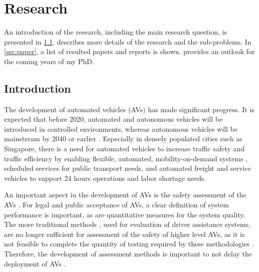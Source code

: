 \section{Research}
\label{sec:research}

An introduction of the research, including the main research question, is presented in \cref{sec:introduction}.  describes more details of the research and the sub-problems. In \cref{sec:paper}, a list of resulted papers and reports is shown.  provides an outlook for the coming years of my PhD.


\subsection{Introduction}
\label{sec:introduction}

The development of automated vehicles (AVs) has made significant progress. It is expected that before 2020, automated and autonomous vehicles will be introduced in controlled environments, whereas autonomous vehicles will be mainstream by 2040 \cite{madni2018autonomous} or earlier \cite{bimbraw2015autonomous}. Especially in densely populated cities such as Singapore, there is a need for automated vehicles to increase traffic safety and traffic efficiency by enabling flexible, automated, mobility-on-demand systems \cite{spieser2014toward}, scheduled services for public transport needs, and automated freight and service vehicles to support 24 hours operations and labor shortage needs.

An important aspect in the development of AVs is the safety assessment of the AVs \cite{bengler2014threedecades, stellet2015taxonomy, putz2017pegasus, wachenfeld2016release}. For legal and public acceptance of AVs, a clear definition of system performance is important, as are quantitative measures for the system quality. The more traditional methods \cite{ISO26262, response2006code}, used for evaluation of driver assistance systems, are no longer sufficient for assessment of the safety of higher level AVs, as it is not feasible to complete the quantity of testing required by these methodologies \cite{wachenfeld2016release}. Therefore, the development of assessment methods is important to not delay the deployment of AVs \cite{bengler2014threedecades}.

